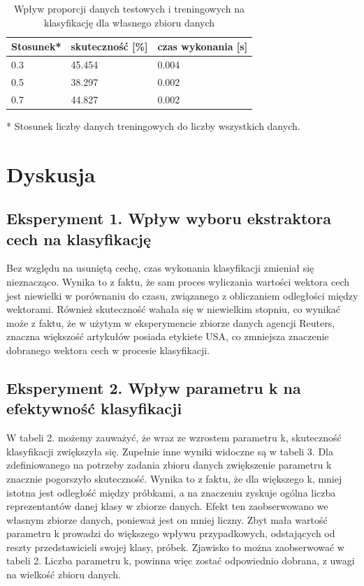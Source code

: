\documentclass{classrep}
\begin{document}
\begin{table}[H]
	\centering
	\caption{Wpływ proporcji danych testowych i treningowych na klasyfikację dla własnego zbioru danych}
	\begin{tabular}{l|l|l}
		Stosunek*& skuteczność [\%] & czas wykonania [s]\\
		\hline
		0.3&45.454&0.004\\
		0.5&38.297&0.002\\
		0.7&44.827&0.002\\
	\end{tabular}
\end{table}

* Stosunek liczby danych treningowych do liczby wszystkich danych.
\newpage
\section{Dyskusja}
\subsection{Eksperyment 1. Wpływ wyboru ekstraktora cech na klasyfikację}
Bez względu na usuniętą cechę, czas wykonania klasyfikacji zmieniał się nieznacząco. Wynika to z faktu, że sam proces wyliczania wartości wektora cech jest niewielki w porównaniu do czasu, związanego z obliczaniem odległości między wektorami. Również skuteczność wahała się w niewielkim stopniu, co wynikać może z faktu, że w użytym w eksperymencie zbiorze danych agencji Reuters, znaczna większość artykułów posiada etykiete USA, co zmniejsza znaczenie dobranego wektora cech w procesie klasyfikacji.
\subsection{Eksperyment 2. Wpływ parametru k na efektywność klasyfikacji}
W tabeli 2. możemy zauważyć, że wraz ze wzrostem parametru k, skuteczność klasyfikacji zwiększyła się. Zupełnie inne wyniki widoczne są w tabeli 3. Dla zdefiniowanego na potrzeby zadania zbioru danych zwiększenie parametru k znacznie pogorszyło skuteczność. Wynika to z faktu, że dla większego k, mniej istotna jest odległość między próbkami, a na znaczeniu zyskuje ogólna liczba reprezentantów danej klasy w zbiorze danych. Efekt ten zaobserwowano we własnym zbiorze danych, ponieważ jest on mniej liczny. Zbyt mała wartość parametru k prowadzi do większego wpływu przypadkowych, odstających od reszty przedstawicieli swojej klasy, próbek. Zjawisko to można zaobserwować w tabeli 2. Liczba parametru k, powinna więc zostać odpowiednio dobrana, z uwagi na wielkość zbioru danych.
\end{document}

